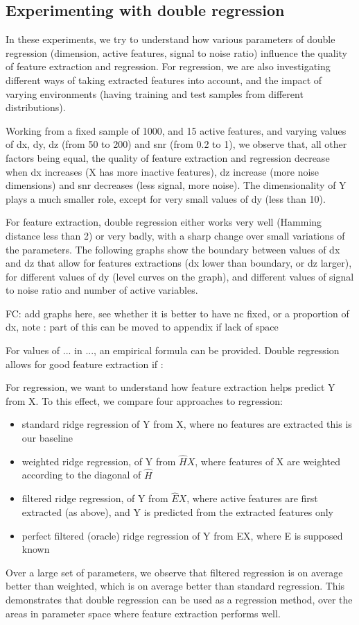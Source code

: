 \documentclass{article}
\begin{document}
\subsection{Experimenting with double regression}
In these experiments, we try to understand how various parameters of double regression (dimension, active features, signal to noise ratio) influence the quality of feature extraction and regression. For regression, we are also investigating different ways of taking extracted features into account, and the impact of varying environments (having training and test samples from different distributions).

Working from a fixed sample of 1000, and 15 active features, and varying values of dx, dy, dz (from 50 to 200) and snr (from 0.2 to 1), we observe that, all other factors being equal, the quality of feature extraction and regression decrease when dx increases (X has more inactive features), dz increase (more noise dimensions) and snr decreases (less signal, more noise). The dimensionality of Y plays a much smaller role, except for very small values of dy (less than 10). 

For feature extraction, double regression either works very well (Hamming distance less than 2) or very badly, with a sharp change over small variations of the parameters. The following graphs show the boundary between values of dx and dz that allow for features extractions (dx lower than boundary, or dz larger), for different values of dy (level curves on the graph), and different values of signal to noise ratio and number of active variables.

FC: add graphs here, see whether it is better to have nc fixed, or a proportion of dx, note : part of this can be moved to appendix if lack of space

For values of ... in ..., an empirical formula can be provided. Double regression allows for good feature extraction if : 

For regression, we want to understand how feature extraction helps predict Y from X. To this effect, we compare four approaches to regression:
\begin{itemize}
\item standard ridge regression of Y from X, where no features are extracted this is our baseline
\item weighted ridge regression, of Y from $\hat H X$, where features of X are weighted according to the diagonal of $\hat H$
\item filtered ridge regression, of Y from $\hat E X$, where active features are first extracted (as above), and Y is predicted from the extracted features only  
\item perfect filtered (oracle) ridge regression of Y from EX, where E is supposed known 
\end{itemize}
Over a large set of parameters, we observe that filtered regression is on average better than weighted, which is on average better than standard regression. This demonstrates that double regression can be used as a regression method, over the areas in parameter space where feature extraction performs well.
\end{document}
